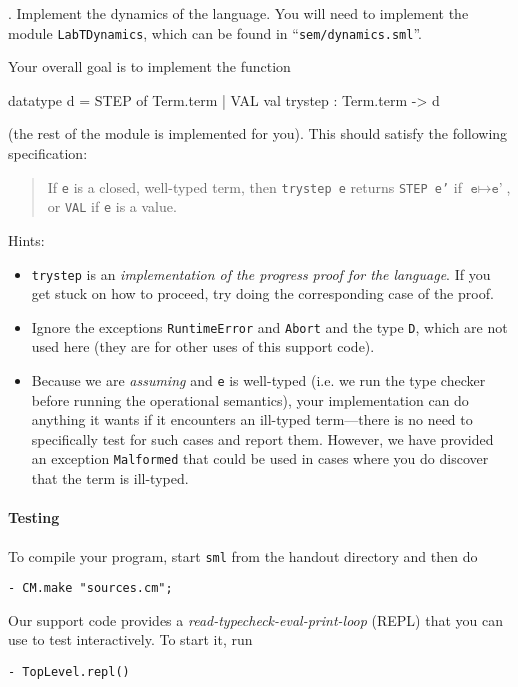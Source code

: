 \documentclass[11pt]{article}
\newcommand\sml[1]{\texttt{#1}}
\newcounter{taskcounter}
\newcounter{taskPercentCounter}
\newcounter{taskcounterSection}
\newcommand{\mayresettaskcounter}{\ifthenelse{\value{taskcounterSection} < \value{section}}
{\setcounter{taskcounterSection}{\value{section}}\setcounter{taskcounter}{1}}{}}
\newcommand{\task}[1]
  {\bigskip \noindent {\bf Task\mayresettaskcounter{}\addtocounter{taskPercentCounter}{#1} \arabic{section}.\arabic{taskcounter}\addtocounter{taskcounter}{1}}.}
\begin{document}
\task{0} Implement the dynamics of the language. You will need to
implement the module \verb|LabTDynamics|, which can be found in
``\verb|sem/dynamics.sml|''. 

 Your overall goal is to implement the function
\begin{code}
  datatype d = STEP of Term.term | VAL
  val trystep : Term.term -> d
\end{code}
(the rest of the module is implemented for you).  This should satisfy
the following specification:
\begin{quote}
If \sml{e} is a closed, well-typed term, then \sml{trystep e} returns
\sml{STEP e'} if $\sml{e} \mapsto \sml{e'}$, or \sml{VAL} if \sml{e} is
a value.
\end{quote}

Hints:
\begin{itemize}
\item \sml{trystep} is an \emph{implementation of the progress proof for
  the language}.  If you get stuck on how to proceed, try doing the
  corresponding case of the proof.

\item Ignore the exceptions \sml{RuntimeError} and \sml{Abort} and the
  type \sml{D}, which are not used here (they are for other uses of this
  support code).

\item Because we are \emph{assuming} and \sml{e} is well-typed (i.e. we
  run the type checker before running the operational semantics), your
  implementation can do anything it wants if it encounters an ill-typed
  term---there is no need to specifically test for such cases and report
  them. However, we have provided an exception \sml{Malformed} that
  could be used in cases where you do discover that the term is
  ill-typed.
\end{itemize}

\paragraph{Testing}

To compile your program, start \sml{sml} from the handout directory and
then do
\begin{verbatim}
- CM.make "sources.cm";
\end{verbatim}

Our support code provides a \emph{read-typecheck-eval-print-loop} (REPL)
that you can use to test interactively.  To start it, run
\begin{verbatim}
- TopLevel.repl()
\end{verbatim}
\end{document}
